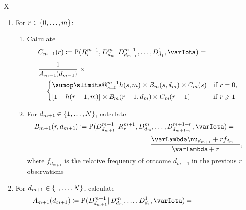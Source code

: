 \documentclass[\ifafour a4paper,12pt,\else a5paper,10pt,\fi%
onecolumn,oneside,article,%
british%
]{memoir}
\makeatletter
\theoremstyle{remark}
\theoremstyle{innote}
\def\sum{\DOTSI\sumop\slimits@}
\newcommand*{\defd}{\coloneqq}
\renewcommand{\le}{\leqslant}%
\renewcommand{\ge}{\geqslant}%
\DeclarePairedDelimiter\set{\{}{\}}
\newcommand*{\p}{\mathrm{P}}%
\renewcommand*{\|}{\mathpunct{|}}
\newcommand*{\yff}{f}
\newcommand*{\yI}{\varIota}
\newcommand*{\yN}{\varLambda}
\newcommand*{\ynn}{\nu}
\newcommand*{\yrs}{h}
\makeatother
\begin{document}
\begin{table}[!b]
  \centering
  \caption{Predictive algorithm}
  \label{tab:adamsetal_algorithm}
  \begin{tabularx}{\textwidth}{X}\hline
    \begin{enumerate}
    \item\label{item:first_step}For $r \in \set{0,\dotsc, m}$:
      \begin{enumerate}[label*=\arabic*.]
      \item Calculate
        \[ \begin{multlined}[t][0.85\textwidth] C_{m+1}(r) \defd
            \p(R^{m+1}_{r} , D^{m}_{d_{m}} \| D^{m-1}_{d_{m-1}}, \dotsc,
            D^{1}_{d_{1}}, \yI) ={}\\[\jot]
       \shoveleft{\frac{1}{A_{m-1}(d_{m-1})} \times{}}\\\begin{cases}
          \sum_{s=0}^{m-1} \yrs(s,m) \times B_m(s,d_m) \times C_m(s) & \text{if $r=0$},
          \\[\jot]
          [1-\yrs(r-1,m)]  \times B_m(r-1,d_m) \times C_m(r-1)& \text{if $r\ge 1$}    
        \end{cases}
      \end{multlined}
    \]
      \item For $d_{m+1} \in \set{1,\dotsc,N}$, calculate
        \[ \begin{multlined}[][0.85\textwidth]
B_{m+1}(r,d_{m+1}) \defd \p(D^{m+1}_{d_{m+1}} \| R^{m+1}_{r}, D^{m}_{d_{m}},
          \dotsc, D^{m+1-r}_{d_{m+1-r}}, \yI) ={}\\[\jot]
         \frac{\yN\ynn_{d_{m+1}}+r\yff_{d_{m+1}}}{\yN + r},
       \end{multlined} \]
     where $\yff_{d_{m+1}}$ is the relative frequency of outcome $d_{m+1}$ in the previous $r$ observations
  \end{enumerate}
\item For $d_{m+1} \in \set{1,\dotsc,N}$, calculate
  \[ \begin{multlined}[][0.85\textwidth]
      A_{m+1}(d_{m+1}) \defd \p(D^{m+1}_{d_{m+1}} \| D^{m}_{d_{m}}, \dotsc, D^{1}_{d_{1}}, \yI) ={}\\[\jot]

\end{multlined}\]
\end{enumerate}
\end{tabularx}
\end{table}
\end{document}
